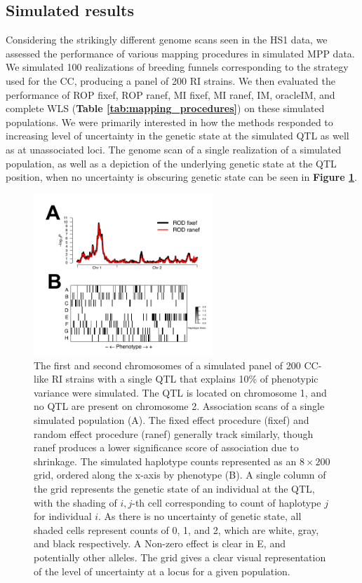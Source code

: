 \subsection{Simulated results}

Considering the strikingly different genome scans seen in the HS1 data, we assessed the performance of various mapping procedures in simulated MPP data. We simulated 100 realizations of breeding funnels corresponding to the strategy used for the CC, producing a panel of 200 RI strains. We then evaluated the performance of ROP fixef, ROP ranef, MI fixef, MI ranef, IM, oracleIM, and complete WLS (\textbf{Table \ref{tab:mapping_procedures}}) on these simulated populations. We were primarily interested in how the methods responded to increasing level of uncertainty in the genetic state at the simulated QTL as well as at unassociated loci. The genome scan of a single realization of a simulated population, as well as a depiction of the underlying genetic state at the QTL position, when no uncertainty is obscuring genetic state can be seen in \textbf{Figure \ref{fig:sim_truth}}.

\begin{figure}
\centering
\includegraphics[width=0.6\textwidth]{figures/4-mi/fixef_mapping_truth.pdf}
\caption[Simulated CC-like population with no uncertainty]{The first and second chromosomes of a simulated panel of 200 CC-like RI strains with a single QTL that explains 10\% of phenotypic variance were simulated. The QTL is located on chromosome 1, and no QTL are present on chromosome 2. Association scans of a single simulated population (A). The fixed effect procedure (fixef) and random effect procedure (ranef) generally track similarly, though ranef produces a lower significance score of association due to shrinkage. The simulated haplotype counts represented as an $8 \times 200$ grid, ordered along the x-axis by phenotype (B). A single column of the grid represents the genetic state of an individual at the QTL, with the shading of $i,j$-th cell corresponding to count of haplotype $j$ for individual $i$. As there is no uncertainty of genetic state, all shaded cells represent counts of 0, 1, and 2, which are white, gray, and black respectively. A Non-zero effect is clear in E, and potentially other alleles. The grid gives a clear visual representation of the level of uncertainty at a locus for a given population.\label{fig:sim_truth}}
\end{figure}

